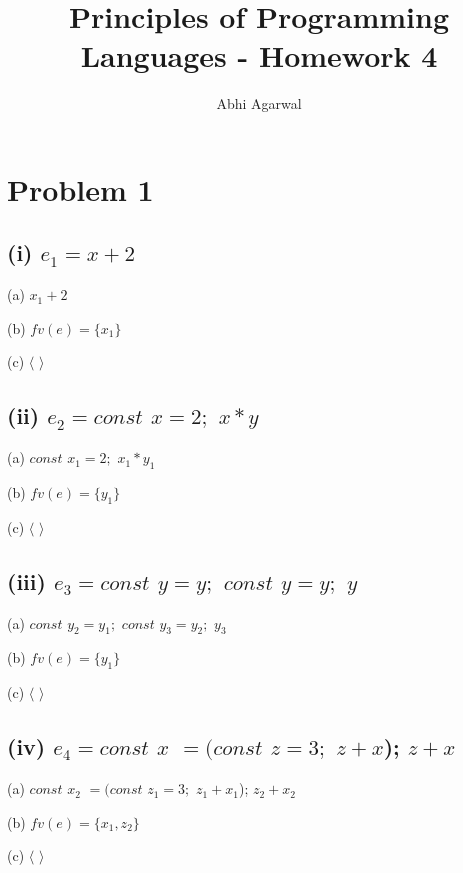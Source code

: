 \documentclass[11pt, oneside]{article}
\title{Principles of Programming Languages - Homework 4}
\author{Abhi Agarwal}
\date{}
\newcommand{\forceindent}{\leavevmode{\parindent=1.5em\indent}}
\begin{document}
\maketitle
\section{Problem 1}
\subsection*{(i) $e_1 = x + 2$}
\forceindent \par (a) $x_1 + 2$
\par (b) $fv (e) = \{x_1\}$
\par (c) $\langle$ $\rangle$

\subsection*{(ii) $e_2 = const$ $x = 2;$ $ x * y$}
\forceindent \par (a) $const$ $x_1 = 2;$ $ x_1 * y_1$
\par (b) $fv (e) = \{y_1\}$
\par (c) $\langle$ $\rangle$

\subsection*{(iii) $e_3 = const$ $y = y;$ $const$ $y = y;$ $y$}
\forceindent \par (a) $const$ $y_2 = y_1;$ $const$ $y_3 = y_2;$ $y_3$
\par (b) $fv (e) = \{y_1\}$
\par (c) $\langle$ $\rangle$

\subsection*{(iv) $e_4 = const$ $x$ $= (const$ $z= 3;$ $z + x$); $z + x$}
\forceindent \par (a) $const$ $x_2$ $= (const$ $z_1 = 3;$ $z_1 + x_1$); $z_2 + x_2$
\par (b) $fv (e) = \{x_1, z_2\}$
\par (c) $\langle$ $\rangle$
\end{document}
